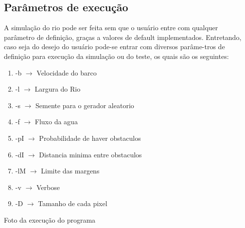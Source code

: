 \documentclass[a4paper,11pt]{article}
\begin{document}
\subsection{Parâmetros de execu\c{c}ão}
A simula\c{c}ão do rio pode ser feita sem que o usuário entre com qualquer parâmetro de defini\c{c}ão, gra\c{c}as a valores de default implementados. Entretando, caso seja do desejo do usuário pode-se entrar com diversos parâme-tros de defini\c{c}ão para execu\c{c}ão da simula\c{c}ão ou do teste, os quais são os seguintes:
\begin{enumerate}
\item[]{-b  $\rightarrow$ Velocidade do barco}
\item[]{-l  $\rightarrow$ Largura do Rio}
\item[]{-s  $\rightarrow$ Semente para o gerador aleatorio}
\item[]{-f  $\rightarrow$ Fluxo da agua}
\item[]{-pI $\rightarrow$ Probabilidade de haver obstaculos}
\item[]{-dI $\rightarrow$ Distancia minima entre obstaculos}
\item[]{-lM $\rightarrow$ Limite das margens}
\item[]{-v  $\rightarrow$ Verbose}
\item[]{-D  $\rightarrow$ Tamanho de cada pixel}
\end{enumerate} 


Foto da execu\c{c}ão do programa
\end{document}
